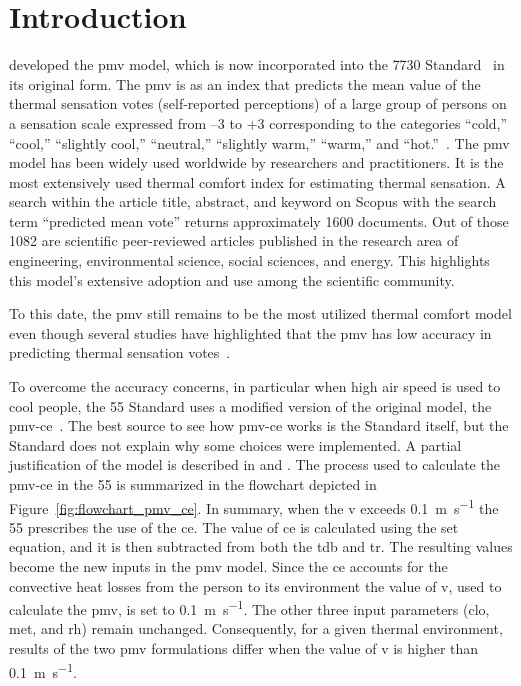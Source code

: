 \section{Introduction}\label{sec:introduction}
 developed the \ac{pmv} model, which is now incorporated into the \gls{7730} Standard~\cite{iso7730} in its original form.
The \ac{pmv} is as an index that predicts the mean value of the thermal sensation votes (self-reported perceptions) of a large group of persons on a sensation scale expressed from –3 to +3 corresponding to the categories ``cold,'' ``cool,'' ``slightly cool,'' ``neutral,'' ``slightly warm,'' ``warm,'' and ``hot.''~\cite{iso7730, ashrae552023}.
The \ac{pmv} model has been widely used worldwide by researchers and practitioners.
It is the most extensively used thermal comfort index for estimating thermal sensation.
A search within the article title, abstract, and keyword on Scopus with the search term ``predicted mean vote'' returns approximately \num{1600} documents.
Out of those \num{1082} are scientific peer-reviewed articles published in the research area of engineering, environmental science, social sciences, and energy.
This highlights this model's extensive adoption and use among the scientific community.

To this date, the \ac{pmv} still remains to be the most utilized thermal comfort model even though several studies have highlighted that the \ac{pmv} has low accuracy in predicting thermal sensation votes~\cite{Cheung2019, Yao2022, kim2019thermal, tartarini2018thermal, Humphreys2002, doherty_evaluation_1988, tartarini_prediction_2023}.

To overcome the accuracy concerns, in particular when high air speed is used to cool people, the \gls{55} Standard uses a modified version of the original model, the \ac{pmv-ce}~\cite{ashrae552023}.
The best source to see how \ac{pmv-ce} works is the Standard itself, but the Standard does not explain why some choices were implemented.
A partial justification of the model is described in  and .
The process used to calculate the \ac{pmv-ce} in the \gls{55} is summarized in the flowchart depicted in Figure~\ref{fig:flowchart_pmv_ce}.
In summary, when the \ac{v} exceeds \qty{0.1}{\m\per\s} the \gls{55} prescribes the use of the \ac{ce}.
The value of \ac{ce} is calculated using the \ac{set} equation, and it is then subtracted from both the \ac{tdb} and \ac{tr}.
The resulting values become the new inputs in the \ac{pmv} model.
Since the \ac{ce} accounts for the convective heat losses from the person to its environment the value of \ac{v}, used to calculate the \ac{pmv}, is set to \qty{0.1}{\m\per\s}.
The other three input parameters (\ac{clo}, \ac{met}, and \ac{rh}) remain unchanged.
Consequently, for a given thermal environment, results of the two \ac{pmv} formulations differ when the value of \ac{v} is higher than \qty{0.1}{\m\per\s}.

